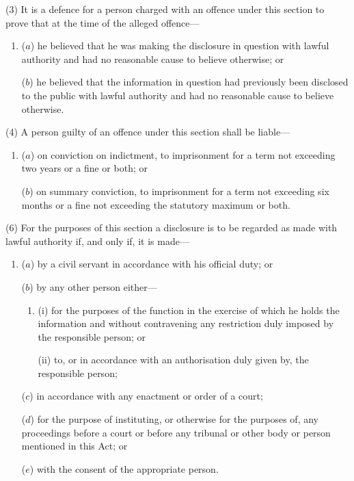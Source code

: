 \documentclass[12pt,a4paper]{article}
\begin{document}
(3) It is a defence for a person charged with an offence under this section to prove that at the time of the alleged offence—
\begin{enumerate}\item[]
($a$) he believed that he was making the disclosure in question with lawful authority and had no reasonable cause to believe otherwise; or

($b$) he believed that the information in question had previously been disclosed to the public with lawful authority and had no reasonable cause to believe otherwise.
\end{enumerate}

(4) A person guilty of an offence under this section shall be liable—
\begin{enumerate}\item[]
($a$) on conviction on indictment, to imprisonment for a term not exceeding two years or a fine or both; or

($b$) on summary conviction, to imprisonment for a term not exceeding six months or a fine not exceeding the statutory maximum or both.
\end{enumerate}

%
%
%
%

(6) For the purposes of this section a disclosure is to be regarded as made with lawful authority if, and only if, it is made—
\begin{enumerate}\item[]
($a$) by a civil servant in accordance with his official duty; or

($b$) by any other person either—
\begin{enumerate}\item[]
(i) for the purposes of the function in the exercise of which he holds the information and without contravening any restriction duly imposed by the responsible person; or

(ii) to, or in accordance with an authorisation duly given by, the responsible person;
\end{enumerate}

($c$) in accordance with any enactment or order of a court;

($d$) for the purpose of instituting, or otherwise for the purposes of, any proceedings before a court or before any tribunal or other body or person mentioned in this Act; or

($e$) with the consent of the appropriate person.
\end{enumerate}
\end{document}
